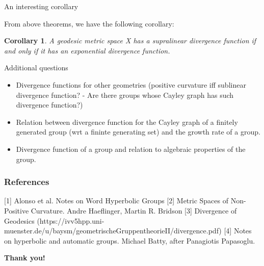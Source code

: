 \documentclass[11pt]{beamer}
\newcommand{\vs}{\vskip10pt}
\newtheorem{cor}[theorem]{Corollary}
\begin{document}
\begin{frame}{An interesting corollary}
	
	From above theorems, we have the following corollary: 
	\vs
	\begin{cor}
		A geodesic metric space X has a supralinear divergence function if and only if it has an exponential divergence function.
	\end{cor}
\end{frame}
	\begin{frame}{Additional questions}
		
		\begin{itemize}
			\item Divergence functions for other geometries (positive curvature iff sublinear divergence function? -  Are there groups whose Cayley graph has such divergence function?)
			\item Relation between divergence function for the Cayley graph of a finitely generated group (wrt a fininte generating set) and the growth rate of a group. 
			\item Divergence function of a group and relation to algebraic properties of the group.
		\end{itemize}
		
	\end{frame}

\begin{frame}
	
	\frametitle{References}
	
	[1] Alonso et al. Notes on Word Hyperbolic Groups
	\vs
	[2] Metric Spaces of Non-Positive Curvature. Andre Haeflinger, Martin R. Bridson
	\vs
	[3] Divergence of Geodesics (https://ivv5hpp.uni-muenster.de/u/baysm/geometrischeGruppentheorieII/divergence.pdf)
	\vs 
	[4] Notes on hyperbolic and automatic groups. Michael Batty, after Panagiotis Papasoglu.
	
\end{frame}

\begin{frame}
	
	\vs
	\vs
	\vs
	\vs
	\begin{center}\textbf{\Large{Thank you!}}\end{center}
	
\end{frame}

	
\end{document}

